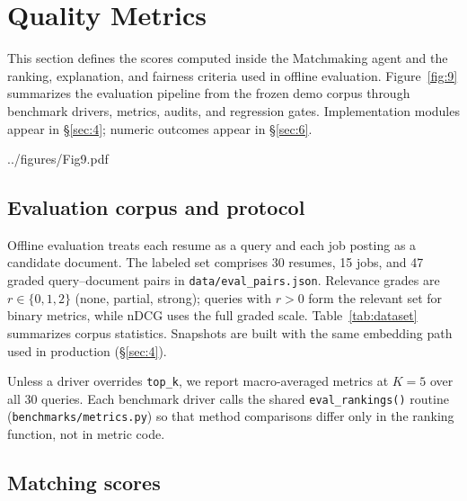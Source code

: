\section{Quality Metrics}\label{sec:5}

This section defines the scores computed inside the Matchmaking agent and the ranking, explanation, and fairness criteria used in offline evaluation.
Figure~\ref{fig:9} summarizes the evaluation pipeline from the frozen demo corpus through benchmark drivers, metrics, audits, and regression gates.
Implementation modules appear in \S\ref{sec:4}; numeric outcomes appear in \S\ref{sec:6}.

\begin{JFigure}{../figures/Fig9.pdf}
\end{JFigure}

\subsection{Evaluation corpus and protocol}\label{sec:5-corpus}

Offline evaluation treats each resume as a query and each job posting as a candidate document.
The labeled set comprises 30 resumes, 15 jobs, and 47 graded query--document pairs in \texttt{data/eval\_pairs.json}.
Relevance grades are $r \in \{0,1,2\}$ (none, partial, strong); queries with $r>0$ form the relevant set for binary metrics, while nDCG uses the full graded scale.
Table~\ref{tab:dataset} summarizes corpus statistics.
Snapshots are built with the same embedding path used in production (\S\ref{sec:4}).

Unless a driver overrides \texttt{top\_k}, we report macro-averaged metrics at $K{=}5$ over all 30 queries.
Each benchmark driver calls the shared \texttt{eval\_rankings()} routine (\texttt{benchmarks/metrics.py}) so that method comparisons differ only in the ranking function, not in metric code.

\begin{JTable}

\end{JTable}

\subsection{Matching scores}\label{sec:5-matching-scores}

